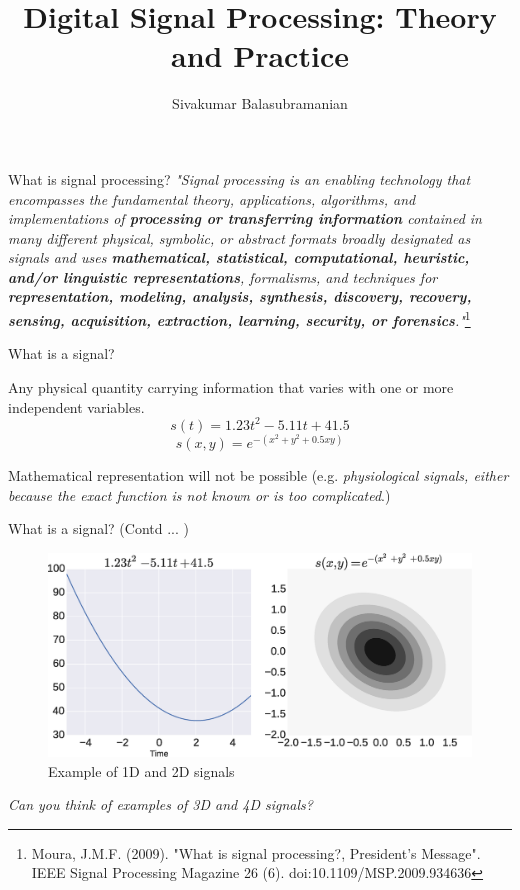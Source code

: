 \documentclass{beamer}
\title{Digital Signal Processing: Theory and Practice}
\subtitle{}
\author{Sivakumar Balasubramanian}
\institute[Christian Medical College] %
{
  \inst{}%
  Department of Bioengineering\\
  Christian Medical College, Bagayam\\
  Vellore 632002
}
\date{}
\begin{document}
\begin{frame}
  \titlepage
\end{frame}

\begin{frame}{What is signal processing?}
\textit{
"Signal processing is an enabling technology that encompasses the fundamental theory, applications, algorithms, and implementations of \textbf{processing or transferring information} contained in many different physical, symbolic, or abstract formats broadly designated as signals and uses \textbf{mathematical, statistical, computational, heuristic, and/or linguistic representations}, formalisms, and techniques for \textbf{representation, modeling, analysis, synthesis, discovery, recovery, sensing, acquisition, extraction, learning, security, or forensics}."}\footnote{\tiny{Moura, J.M.F. (2009). "What is signal processing?, President’s Message". IEEE Signal Processing Magazine 26 (6). doi:10.1109/MSP.2009.934636}}
\end{frame}

\begin{frame}{What is a signal?}

Any physical quantity carrying information that varies with one or more independent variables.
$$ s\left(t\right) = 1.23t^2 - 5.11t +41.5 $$
$$ s\left(x,y\right) = e^{-(x^2 + y^2 + 0.5xy)} $$

Mathematical representation will not be possible (e.g. \textit{physiological signals,  either because the exact function is not known or is too complicated}.)
\end{frame}

\begin{frame}{What is a signal? (Contd ... )}

\begin{figure}
\includegraphics[width=\textwidth]{img/signals.eps}
\caption{Example of 1D and 2D signals}
\end{figure}

\textit{Can you think of examples of 3D and 4D signals?}
\end{frame}
\end{document}
